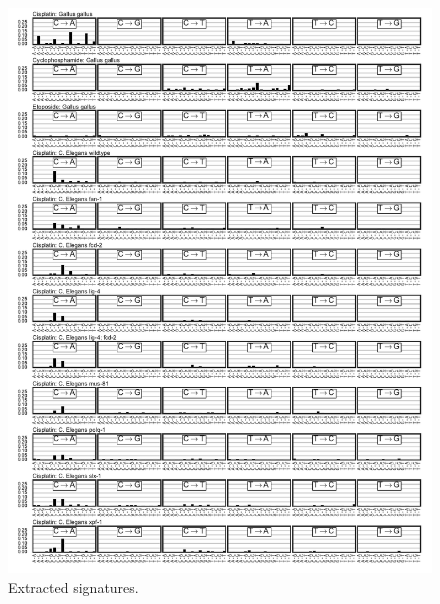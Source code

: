 \begin{figure}
\centering
\includegraphics[scale=1.0]{figures/extracted_signatures.pdf}
\caption{Extracted signatures. }
\label{sfig:supp_extracted_signatures}
\end{figure}
